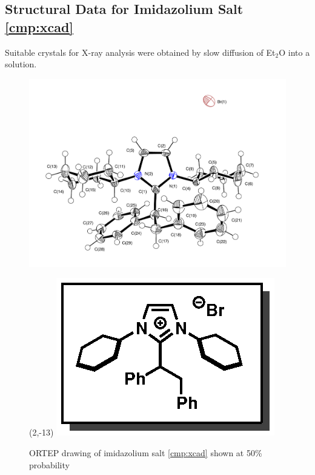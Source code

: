 \subsection{Structural Data for Imidazolium Salt \ref{cmp:xcad}}
Suitable crystals for X-ray analysis were obtained by slow diffusion of Et$_2$O into a 
solution.
\begin{figure}[h]
  \includegraphics[width=6in]{chp_alkylation/images/xray/xcad_labelled}
    \begin{textblock}{1}(2,-13)
\includegraphics[scale=0.8]{chp_alkylation/images/xcad}
\end{textblock}
  \caption{ORTEP drawing of  imidazolium salt \ref{cmp:xcad} shown at 50\% probability }
\end{figure}

